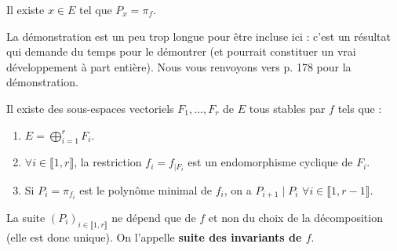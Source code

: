 
  \begin{lemma}
    \label{invariants-de-similitude-2}
    Il existe $x \in E$ tel que $P_x = \pi_f$.
  \end{lemma}

  La démonstration est un peu trop longue pour être incluse ici : c'est un résultat qui demande du temps pour le démontrer (et pourrait constituer un vrai développement à part entière). Nous vous renvoyons vers \cite{[GOU21]} p. 178 pour la démonstration.

  \begin{theorem}[Frobenius]
    Il existe des sous-espaces vectoriels $F_1, \dots, F_r$ de $E$ tous stables par $f$ tels que :
    \begin{enumerate}[label=(\roman*)]
      \item \label{invariants-de-similitude-3} $E = \bigoplus_{i = 1}^r F_i$.
      \item \label{invariants-de-similitude-4} $\forall i \in \llbracket 1, r \rrbracket$, la restriction $f_i = f_{|F_i}$ est un endomorphisme cyclique de $F_i$.
      \item \label{invariants-de-similitude-5} Si $P_i = \pi_{f_i}$ est le polynôme minimal de $f_i$, on a $P_{i+1} \mid P_i$ $\forall i \in \llbracket 1, r-1 \rrbracket$.
    \end{enumerate}
    La suite $(P_i)_{i \in \llbracket 1, r \rrbracket}$ ne dépend que de $f$ et non du choix de la décomposition (elle est donc unique). On l'appelle \textbf{suite des invariants de $f$}.
  \end{theorem}

